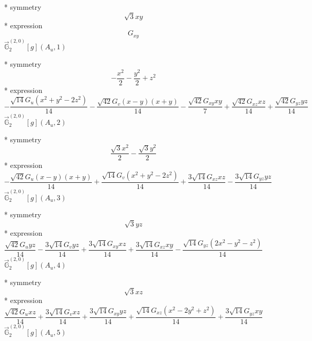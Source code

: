 \documentclass[fleqn,8pt]{jsarticle}
\begin{document}
\noindent\quad ** symmetry
\begin{dmath*}
\sqrt{3} x y
\end{dmath*}
\noindent\quad ** expression
\begin{dmath*}
G_{xy}
\end{dmath*}
\noindent\quad $\vec{\mathbb{G}}_{2}^{(2,0)}[g](A_{u},1)$

\noindent\quad ** symmetry
\begin{dmath*}
- \frac{x^{2}}{2} - \frac{y^{2}}{2} + z^{2}
\end{dmath*}
\noindent\quad ** expression
\begin{dmath*}
- \frac{\sqrt{14} G_{u} \left(x^{2} + y^{2} - 2 z^{2}\right)}{14} - \frac{\sqrt{42} G_{v} \left(x - y\right) \left(x + y\right)}{14} - \frac{\sqrt{42} G_{xy} x y}{7} + \frac{\sqrt{42} G_{xz} x z}{14} + \frac{\sqrt{42} G_{yz} y z}{14}
\end{dmath*}
\noindent\quad $\vec{\mathbb{G}}_{2}^{(2,0)}[g](A_{u},2)$

\noindent\quad ** symmetry
\begin{dmath*}
\frac{\sqrt{3} x^{2}}{2} - \frac{\sqrt{3} y^{2}}{2}
\end{dmath*}
\noindent\quad ** expression
\begin{dmath*}
- \frac{\sqrt{42} G_{u} \left(x - y\right) \left(x + y\right)}{14} + \frac{\sqrt{14} G_{v} \left(x^{2} + y^{2} - 2 z^{2}\right)}{14} + \frac{3 \sqrt{14} G_{xz} x z}{14} - \frac{3 \sqrt{14} G_{yz} y z}{14}
\end{dmath*}
\noindent\quad $\vec{\mathbb{G}}_{2}^{(2,0)}[g](A_{u},3)$

\noindent\quad ** symmetry
\begin{dmath*}
\sqrt{3} y z
\end{dmath*}
\noindent\quad ** expression
\begin{dmath*}
\frac{\sqrt{42} G_{u} y z}{14} - \frac{3 \sqrt{14} G_{v} y z}{14} + \frac{3 \sqrt{14} G_{xy} x z}{14} + \frac{3 \sqrt{14} G_{xz} x y}{14} - \frac{\sqrt{14} G_{yz} \left(2 x^{2} - y^{2} - z^{2}\right)}{14}
\end{dmath*}
\noindent\quad $\vec{\mathbb{G}}_{2}^{(2,0)}[g](A_{u},4)$

\noindent\quad ** symmetry
\begin{dmath*}
\sqrt{3} x z
\end{dmath*}
\noindent\quad ** expression
\begin{dmath*}
\frac{\sqrt{42} G_{u} x z}{14} + \frac{3 \sqrt{14} G_{v} x z}{14} + \frac{3 \sqrt{14} G_{xy} y z}{14} + \frac{\sqrt{14} G_{xz} \left(x^{2} - 2 y^{2} + z^{2}\right)}{14} + \frac{3 \sqrt{14} G_{yz} x y}{14}
\end{dmath*}
\noindent\quad $\vec{\mathbb{G}}_{2}^{(2,0)}[g](A_{u},5)$
\end{document}
